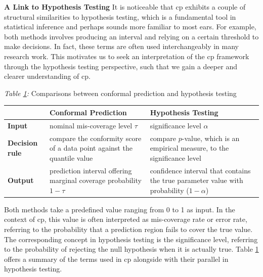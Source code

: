 \documentclass[a4paper,oneside,bibliography=totoc]{scrbook}
\begin{document}
\vspace{1.5em}
\noindent \textbf{A Link to Hypothesis Testing} It is noticeable that \gls{cp} exhibits a couple of structural similarities to hypothesis testing, which is a fundamental tool in statistical inference and perhaps sounds more familiar to most ears. For example, both methods involves producing an interval and relying on a certain threshold to make decisions. In fact, these terms are often used interchangeably in many research work. This motivates us to seek an interpretation of the \gls{cp} framework through the hypothesis testing perspective, such that we gain a deeper and clearer understanding of \gls{cp}. \vspace{2em}

\begin{table}[h]
    \centering
   	
 	{\small \textit{Table \ref{tab:cpht_comparison}:} Comparisons between conformal prediction and hypothesis testing}
	\vspace{0.7em}

    \renewcommand{\arraystretch}{1.2}
   	\begin{tabular}{| m{1.5cm} | m{6cm} | m{5.8cm} |}
    \hline
    &\textbf{Conformal Prediction} & \textbf{Hypothesis Testing} \\
    \hline
    \textbf{Input} & nominal mis-coverage level $\tau$ & significance level $\alpha$ \\
    \hline
    \textbf{Decision rule} & compare the conformity score of a data point against the quantile value & compare $p$-value, which is an empirical measure, to the significance level \\ 
    \hline
	\textbf{Output} & prediction interval offering marginal coverage probability $1 - \tau$ & confidence interval that contains the true parameter value with probability ($1 - \alpha$)  \\
	\hline        		
    \end{tabular}
    \label{tab:cpht_comparison}
\end{table}
	 
\vspace{0.5em} 	  	
Both methods take a predefined value ranging from 0 to 1 as input. In the context of \gls{cp}, this value is often interpreted as mis-coverage rate or error rate, referring to the probability that a prediction region fails to cover the true value. The corresponding concept in hypothesis testing is the significance level, referring to the probability of rejecting the null hypothesis when it is actually true. Table \ref{tab:cpht_comparison} offers a summary of the terms used in \gls{cp} alongside with their parallel in hypothesis testing.
\end{document}
